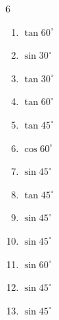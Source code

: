 \begin{multicols}{6}
\begin{enumerate}
  \item $\displaystyle \tan{60^\circ}$


  \item $\displaystyle \sin{30^\circ}$


  \item $\displaystyle \tan{30^\circ}$


  \item $\displaystyle \tan{60^\circ}$


  \item $\displaystyle \tan{45^\circ}$

        \phantom{$\displaystyle =1$}

  \item $\displaystyle \cos{60^\circ}$


  \item $\displaystyle \sin{45^\circ}$


  \item $\displaystyle \tan{45^\circ}$

        \phantom{$\displaystyle =1$}

  \item $\displaystyle \sin{45^\circ}$


  \item $\displaystyle \sin{45^\circ}$


  \item $\displaystyle \sin{60^\circ}$


  \item $\displaystyle \sin{45^\circ}$


  \item $\displaystyle \sin{45^\circ}$


\end{enumerate}
\end{multicols}
